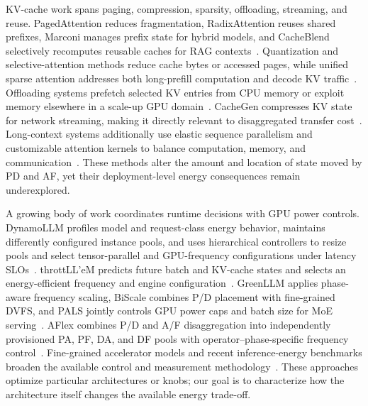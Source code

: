 KV-cache work spans paging, compression, sparsity, offloading, streaming, and reuse. PagedAttention reduces fragmentation, RadixAttention reuses shared prefixes, Marconi manages prefix state for hybrid models, and CacheBlend selectively recomputes reusable caches for RAG contexts~\cite{kwon2023vllm,zheng2024sglang,pan2025marconi,yao2025cacheblend}. Quantization and selective-attention methods reduce cache bytes or accessed pages, while unified sparse attention addresses both long-prefill computation and decode KV traffic~\cite{zhang2023h2o,xiao2024streamingllm,li2024snapkv,chen2024arkvale,lin2025qserve,yang2025lserve,gao2025rethinkingkv}. Offloading systems prefetch selected KV entries from CPU memory or exploit memory elsewhere in a scale-up GPU domain~\cite{lee2024infinigen,kumar2025aqua}. CacheGen compresses KV state for network streaming, making it directly relevant to disaggregated transfer cost~\cite{liu2024cachegen}. Long-context systems additionally use elastic sequence parallelism and customizable attention kernels to balance computation, memory, and communication~\cite{wu2024loongserve,ye2025flashinfer}. These methods alter the amount and location of state moved by PD and AF, yet their deployment-level energy consequences remain underexplored.

A growing body of work coordinates runtime decisions with GPU power controls. DynamoLLM profiles model and request-class energy behavior, maintains differently configured instance pools, and uses hierarchical controllers to resize pools and select tensor-parallel and GPU-frequency configurations under latency SLOs~\cite{stojkovic2025dynamollm}. throttLL'eM predicts future batch and KV-cache states and selects an energy-efficient frequency and engine configuration~\cite{kakolyris2025throttll}. GreenLLM applies phase-aware frequency scaling, BiScale combines P/D placement with fine-grained DVFS, and PALS jointly controls GPU power caps and batch size for MoE serving~\cite{liu2025greenllm,basit2026biscale,hankendi2026pals}. AFlex combines P/D and A/F disaggregation into independently provisioned PA, PF, DA, and DF pools with operator--phase-specific frequency control~\cite{hu2026energy}. Fine-grained accelerator models and recent inference-energy benchmarks broaden the available control and measurement methodology~\cite{wang2025using,chung2025mlenergy}. These approaches optimize particular architectures or knobs; our goal is to characterize how the architecture itself changes the available energy trade-off.

